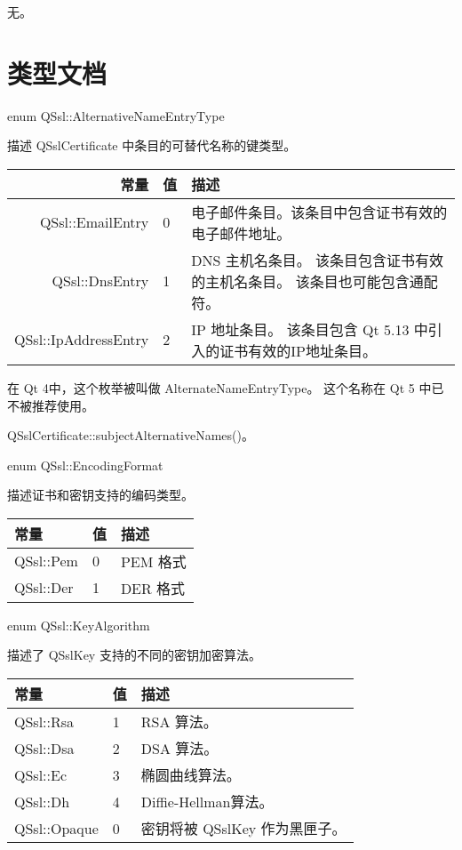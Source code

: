 无。

\section{类型文档}

enum QSsl::AlternativeNameEntryType

描述 QSslCertificate 中条目的可替代名称的键类型。

\begin{tabular}{|r|l|m{25em}|}
	\hline
	常量 	&值& 	描述 \\ 
	\hline
QSsl::EmailEntry  &	0 	&电子邮件条目。该条目中包含证书有效的电子邮件地址。\\
\hline
QSsl::DnsEntry 	&1& 	DNS 主机名条目。 该条目包含证书有效的主机名条目。 该条目也可能包含通配符。\\
\hline
QSsl::IpAddressEntry 	&2& 	IP 地址条目。 该条目包含 Qt 5.13 中引入的证书有效的IP地址条目。\\
	\hline
\end{tabular}


\begin{notice}
在 Qt 4中，这个枚举被叫做 AlternateNameEntryType。 这个名称在 Qt 5 中已不被推荐使用。
\end{notice}

\begin{seeAlso}
QSslCertificate::subjectAlternativeNames()。
\end{seeAlso}


enum QSsl::EncodingFormat

描述证书和密钥支持的编码类型。

\begin{tabular}{|l|l|l|}
	\hline
	常量 	&值& 	描述 \\ 
	\hline
	QSsl::Pem &	0 	&PEM 格式 \\ 
	\hline
	QSsl::Der &	1& 	DER 格式 \\ 
	\hline
\end{tabular}


enum QSsl::KeyAlgorithm

描述了 QSslKey 支持的不同的密钥加密算法。

\begin{tabular}{|l|l|l|}
	\hline
	常量 	&值& 	描述 \\ 
	\hline
	QSsl::Rsa &	1 	&RSA 算法。 \\ 
	\hline
	QSsl::Dsa &	2 	&DSA 算法。 \\ 
	\hline
	QSsl::Ec 	&3 	&椭圆曲线算法。 \\ 
	\hline
	QSsl::Dh 	&4 	&Diffie-Hellman算法。 \\ 
	\hline
	QSsl::Opaque &	0 &	密钥将被 QSslKey 作为黑匣子。 \\ 
	\hline
\end{tabular}

